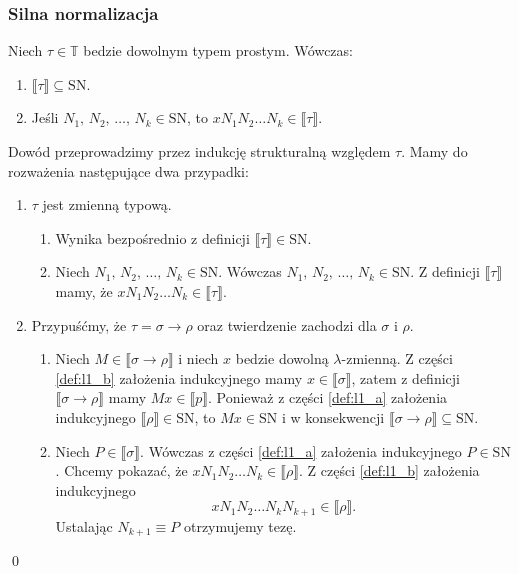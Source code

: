 \subsubsection{Silna normalizacja}
\begin{lemat}\label{thm:sn_lemat1}
  Niech \(\tau\in\mathbb{T}\) bedzie dowolnym typem prostym. Wówczas:
  \begin{enumerate}[label=(\arabic*)]
    \setlength\itemsep{0em}
    \item \(\llbracket \tau \rrbracket  \subseteq \mathrm{SN}\).\label{def:l1_a}
    \item Jeśli \(N_1,\,N_2,\,\dots,\,N_k\in\mathrm{SN}\), to \(xN_1 N_2 \dots N_k \in \llbracket \tau \rrbracket\).\label{def:l1_b}
  \end{enumerate}
\end{lemat}
\begin{dowod}
  Dowód przeprowadzimy przez indukcję strukturalną względem \(\tau\). Mamy do rozważenia następujące dwa przypadki:
  \begin{enumerate}[label=(\alph*)]
    \setlength\itemsep{0em}
    \item \(\tau\) jest zmienną typową.
     \begin{enumerate}[label=(\arabic*)]
      \setlength\itemsep{0em}
     
        \item Wynika bezpośrednio z definicji \(\llbracket \tau \rrbracket\in \mathrm{SN}\). 
         
        \item Niech \(N_1,\,N_2,\,\dots,\,N_k \in \mathrm{SN}\). Wówczas \(N_1,\,N_2,\,\dots,\,N_k\in\mathrm{SN}\). Z definicji \(\llbracket \tau \rrbracket\) mamy, że \(xN_1 N_2 \dots N_k \in\llbracket \tau \rrbracket\).
      \end{enumerate}

    \item Przypuśćmy, że \(\tau=\sigma\to\rho\) oraz twierdzenie zachodzi dla \(\sigma\) i \(\rho\).
    \begin{enumerate}[label=(\arabic*)]
    \setlength\itemsep{0em}

    \item Niech \(M\in\llbracket \sigma \to \rho\rrbracket\) i niech \(x\) bedzie dowolną \(\lambda\)-zmienną. Z części \ref{def:l1_b} założenia indukcyjnego mamy \(x\in\llbracket \sigma \rrbracket\), zatem z definicji \(\llbracket \sigma\to\rho\rrbracket\) mamy \(Mx\in\llbracket p\rrbracket\). Ponieważ z części \ref{def:l1_a} założenia indukcyjnego \(\llbracket\rho\rrbracket\in\mathrm{SN}\), to \(Mx\in\mathrm{SN}\) i w konsekwencji \(\llbracket\sigma\to\rho\rrbracket\subseteq \mathrm{SN}\).
    \item Niech \(P\in\llbracket \sigma \rrbracket\). Wówczas z części \ref{def:l1_a} założenia indukcyjnego \(P\in\mathrm{SN}\). Chcemy pokazać, że \(xN_1 N_2 \dots N_k \in \llbracket \rho \rrbracket\). Z części \ref{def:l1_b} założenia indukcyjnego \[xN_1 N_2 \dots N_k N_{k+1} \in \llbracket \rho \rrbracket.\] Ustalając \(N_{k+1}\equiv P\) otrzymujemy tezę.
     \end{enumerate}
  \end{enumerate}
  \qed
\end{dowod}

